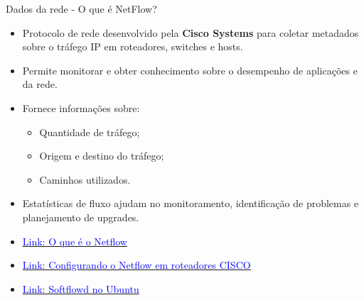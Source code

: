 \begin{frame}{Dados da rede - O que é NetFlow?}
\begin{itemize}
    \item Protocolo de rede desenvolvido pela \textbf{Cisco Systems} para coletar metadados sobre o tráfego IP em roteadores, switches e hosts.
    \item Permite monitorar e obter conhecimento sobre o desempenho de aplicações e da rede.
    \item Fornece informações sobre:
    \begin{itemize}
        \item Quantidade de tráfego;
        \item Origem e destino do tráfego;
        \item Caminhos utilizados.
    \end{itemize}
    \item Estatísticas de fluxo ajudam no monitoramento, identificação de problemas e planejamento de upgrades.
\end{itemize}

\begin{itemize}
    \item \href{https://www.ibm.com/br-pt/think/topics/netflow}{\textcolor{blue}{Link: O que é o Netflow}}
    \item \href{https://www.ibm.com/docs/pt-br/npi/1.3.0?topic=devices-configuring-netflow-cisco-routers}{\textcolor{blue}{Link: Configurando o Netflow em roteadores CISCO}}
    \item \href{https://manpages.ubuntu.com/manpages/noble/man8/softflowd.8.html}{\textcolor{blue}{Link: Softflowd no Ubuntu}}
\end{itemize}
\end{frame}

